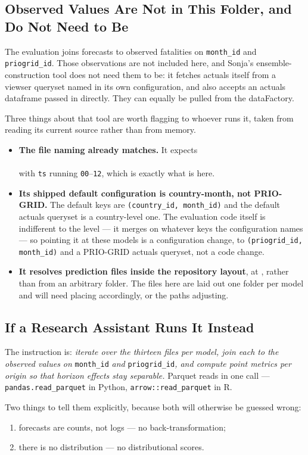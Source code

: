\subsection*{Observed Values Are Not in This Folder, and Do Not Need to Be}

The evaluation joins forecasts to observed fatalities on \texttt{month\_id} and
\texttt{priogrid\_id}. Those observations are not included here, and Sonja's ensemble-construction
tool does not need them to be: it fetches actuals itself from a viewser queryset named in its own
configuration, and also accepts an actuals dataframe passed in directly. They can equally be pulled
from the dataFactory.

Three things about that tool are worth flagging to whoever runs it, taken from reading its current
source rather than from memory.

\begin{itemize}
    \item \textbf{The file naming already matches.} It expects\\
          \\
          with \texttt{ts} running \texttt{00}--\texttt{12}, which is exactly what is here.
    \item \textbf{Its shipped default configuration is country-month, not PRIO-GRID.} The default
          keys are \texttt{(country\_id, month\_id)} and the default actuals queryset is a
          country-level one. The evaluation code itself is indifferent to the level --- it merges
          on whatever keys the configuration names --- so pointing it at these models is a
          configuration change, to \texttt{(priogrid\_id, month\_id)} and a PRIO-GRID actuals
          queryset, not a code change.
    \item \textbf{It resolves prediction files inside the repository layout}, at
          , rather than from an
          arbitrary folder. The files here are laid out one folder per model and will need placing
          accordingly, or the paths adjusting.
\end{itemize}

\subsection*{If a Research Assistant Runs It Instead}

The instruction is: \textit{iterate over the thirteen files per model, join each to the observed
values on} \texttt{month\_id} \textit{and} \texttt{priogrid\_id}\textit{, and compute point metrics
per origin so that horizon effects stay separable.} Parquet reads in one call ---
\texttt{pandas.read\_parquet} in Python, \texttt{arrow::read\_parquet} in R.

Two things to tell them explicitly, because both will otherwise be guessed wrong:

\begin{enumerate}
    \item forecasts are counts, not logs --- no back-transformation;
    \item there is no distribution --- no distributional scores.
\end{enumerate}
